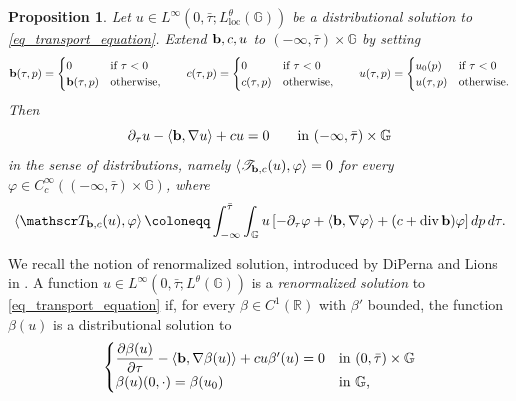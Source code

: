 \documentclass[11pt]{amsart}
\newcommand{\rr}{\mathbb R}
\newcommand{\bb}{{\bf {b}}} %
\DeclareMathOperator{\divv}{div}
\theoremstyle{plain}
\newtheorem{proposition}[theorem]{Proposition}
\theoremstyle{definition}
\theoremstyle{remark}
\numberwithin{equation}{section}
\begin{document}
\begin{proposition}\label{propositiondelellis}
  Let $u \in L^\infty\left(0,\bar{\tau};L^\theta_{\mathrm{loc}}(\mathbb{G})\right)$ be a distributional solution to \eqref{eq_transport_equation}. Extend $\bb,c,u$ to $(-\infty,\bar\tau)\times\mathbb{G}$ by setting
   \begin{equation}\label{extensiondelellis}
\bb(\tau,p)=\begin{cases}
0 & \text{if $\tau<0$}\\
\bb(\tau,p) & \text{otherwise,}
\end{cases}
\qquad   
c(\tau,p)=\begin{cases}
0 & \text{if $\tau<0$}\\
c(\tau,p) & \text{otherwise,}
\end{cases}
\qquad 
u(\tau,p)=\begin{cases}
u_0(p) & \text{if $\tau<0$}\\
u(\tau,p) & \text{otherwise.}
\end{cases}
\end{equation}
Then 
\begin{equation*}
    \partial_\tau u - \left\langle \bb,\nabla u\right\rangle + cu = 0  \qquad\text{in $(-\infty,\bar{\tau}) \times \mathbb{G}$}
\end{equation*}
in the sense of distributions, namely $\langle \mathscr T_{\bb,c}(u),\varphi\rangle=0$ for every $\varphi\in C_c^\infty((-\infty,\bar{\tau})\times\mathbb{G})$, where
\begin{equation}\label{equazioneestesasenzadato}
   \left\langle \mathscr T_{\bb,c}(u),\varphi\right\rangle\coloneqq \int_{-\infty}^{\bar{\tau}}\int_{\mathbb{G}}u\left[-\partial_\tau\varphi+\langle \bb, \nabla \varphi \rangle+(c+\divv \bb)\varphi\right] dp\,d\tau.
\end{equation}
\end{proposition}
We recall the notion of renormalized solution, introduced by DiPerna and Lions in \cite{MR1022305}. A function $u\in L^\infty\left(0,\bar\tau;L^\theta(\mathbb{G})\right)$ is a \emph{renormalized solution} to \eqref{eq_transport_equation} if, for every $\beta \in C^1(\rr)$ with
$\beta'$ bounded, the function $\beta(u)$ is a distributional solution to
\begin{equation*} 
\begin{cases}
\dfrac{\partial \beta(u)}{\partial \tau}-\left\langle \bb,\nabla \beta (u)\right\rangle + cu\beta' (u) = 0 & \text{in $(0,\bar{\tau}) \times\mathbb{G}$}\\
\beta(u)(0,\cdot)=\beta(u_0) & \text{in $\mathbb{G}$,}
\end{cases}
\end{equation*}
\end{document}
